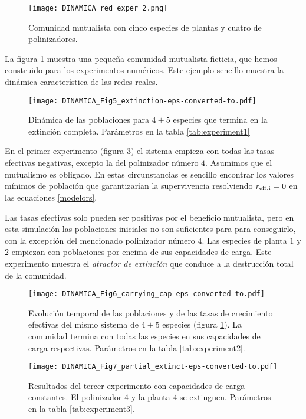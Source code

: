 \begin{figure}[h!]
\centering
\texttt{[image: DINAMICA\_red\_exper\_2.png]}
\caption {Comunidad mutualista con cinco especies de plantas y cuatro de polinizadores.}
\label{fig:red_exper_stab1}
\end{figure}

La figura \ref{fig:red_exper_stab1} muestra una pequeña comunidad mutualista ficticia, que hemos construido para los experimentos numéricos. Este ejemplo sencillo muestra la dinámica característica de las redes reales.

\begin{figure}[ht!]
\centering
\texttt{[image: DINAMICA\_Fig5\_extinction-eps-converted-to.pdf]}
\caption {Dinámica de las poblaciones para $4+5$ especies que termina en la extinción completa. Parámetros en la tabla \ref{tab:experiment1}}
\label{fig:exper_stab1}
\end{figure}

En el primer experimento (figura \ref{fig:exper_carrying_cap}) el sistema empieza con todas las tasas efectivas negativas, excepto la del polinizador número $4$. Asumimos que el mutualismo es obligado. En estas circunstancias es sencillo encontrar los valores mínimos de población que garantizarían la supervivencia resolviendo $r_{\rm{eff},i} = 0$ en las ecuaciones \ref{modelors}.

Las tasas efectivas solo pueden ser positivas por el beneficio mutualista, pero en esta simulación las poblaciones iniciales no son suficientes para para conseguirlo, con la excepción del mencionado polinizador número $4$. Las especies de planta $1$ y $2$ empiezan con poblaciones por encima de sus capacidades de carga.
Este experimento muestra el \textit{atractor de extinción} que conduce a la destrucción total de la comunidad.

\begin{figure}[ht!]
\centering
\texttt{[image: DINAMICA\_Fig6\_carrying\_cap-eps-converted-to.pdf]}
\caption {Evolución temporal de las poblaciones y de las tasas de crecimiento efectivas del mismo sistema de $4+5$ especies (figura \ref{fig:red_exper_stab1}). La comunidad termina con todas las especies en sus capacidades de carga respectivas. Parámetros en la tabla \ref{tab:experiment2}.}
\label{fig:exper_carrying_cap}
\end{figure}

\begin{figure}[h!]
\centering
\texttt{[image: DINAMICA\_Fig7\_partial\_extinct-eps-converted-to.pdf]}
\caption {Resultados del tercer experimento con capacidades de carga constantes. El polinizador $4$ y la planta $4$ se extinguen. Parámetros en la tabla \ref{tab:experiment3}.}
\label{fig:exper_stab2}
\end{figure}

